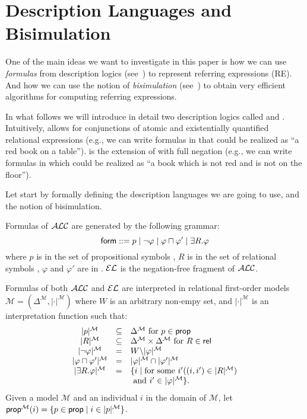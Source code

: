 \newcommand{\gM}{\mathcal{M}}
\newcommand{\gL}{\mathcal{L}}


\section{Description Languages and Bisimulation} \label{sec:bisim}

One of the main ideas we want to investigate in this paper is
how we can use \emph{formulas} from description logics (see~\cite{baad:desc03}) to represent
referring expressions (RE). And how we can use the notion of \emph{bisimulation}
(see~\cite{blac:moda01}) to obtain very efficient algorithms for computing referring expressions.
 
In what follows we will introduce in detail two description logics called \el and \alc.  Intuitively, \el allows
for conjunctions of atomic and existentially quantified relational expressions (e.g.,
we can write formulas in \el that could be realized as ``a red book on a table''). \alc is the extension of \el with full negation
(e.g., we can write formulas in \alc which could be realized as ``a book which is not red and is not on the floor'').

Let start by formally defining the description languages we are going to use, and the notion of bisimulation.

\begin{definition}
Formulas of $\mathcal{ALC}$ are generated by the following grammar:
$$
\textsf{form} ::= p \mid \neg \varphi \mid \varphi \sqcap \varphi' \mid \exists R. \varphi
$$
where $p$ is in the set of propositional symbols \prop, $R$ is in the set of relational symbols \rel, $\varphi$ and $\varphi'$ are in \form. $\mathcal{EL}$ is the
negation-free fragment of $\mathcal{ALC}$.

Formulas of both $\mathcal{ALC}$ and $\mathcal{EL}$ are interpreted in relational first-order models
$\gM = (\Delta^\gM,|\cdot|^\gM)$ where $W$ is an arbitrary non-empy set, and $|\cdot|^\gM$ is an interpretation
function such that:
$$
\begin{array}{ccl}
|p|^\gM & \subseteq & \Delta^\gM  \mbox{ for $p \in \prop$}\\
|R|^\gM & \subseteq & \Delta^\gM \times \Delta^\gM  \mbox{ for $R \in \rel$}\\
|\neg \varphi|^\gM & = & W \backslash |\varphi|^\gM\\
|\varphi \sqcap \varphi'|^\gM & = & |\varphi|^\gM \cap |\varphi'|^\gM\\
|\exists R.\varphi|^\gM & = & \{i \mid \mbox{for some } i' ((i,i') \in |R|^\gM)\\
& & \mbox{ and } i' \in |\varphi|^\gM \}.\\
\end{array}
$$
Given a model $\gM$ and an individual $i$ in the domain of $\gM$, let
$\propm(i) = \{p \in \prop \mid i \in |p|^\gM\}$.
\end{definition}


